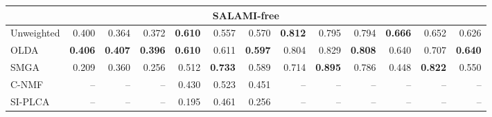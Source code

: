 \documentclass{article}
\begin{document}
\begin{table}
\begin{tabular}{lrrrrrrrrrrrr}
\multicolumn{13}{c}{SALAMI-free}\\
\toprule%
Unweighted  & 0.400 & 0.364 & 0.372 & \textbf{0.610} & 0.557 & 0.570 & \textbf{0.812} & 0.795 & 0.794 & \textbf{0.666} & 0.652 & 0.626\\
OLDA    & \textbf{0.406} & \textbf{0.407} & \textbf{0.396} & \textbf{0.610} & 0.611 & \textbf{0.597} & 0.804 & 0.829 & \textbf{0.808} & 0.640 & 0.707 & \textbf{0.640}\\
\hline
SMGA~\hfill\cite{serra2012unsupervised}
        & 0.209 & 0.360 & 0.256 & 0.512 & \textbf{0.733} & 0.589 & 0.714 & \textbf{0.895} & 0.786 & 0.448 & \textbf{0.822} & 0.550\\
C-NMF~\hfill\cite{nieto2013convex}            
        & -- & -- & -- & 0.430 & 0.523 & 0.451 & -- & -- & -- & -- & -- & -- \\
SI-PLCA~\hfill\cite{weiss2011unsupervised}    
        & -- & -- & -- & 0.195 & 0.461 & 0.256 & -- & -- & -- & -- & -- & -- \\  
\bottomrule%
\end{tabular}
\end{table}
\end{document}
